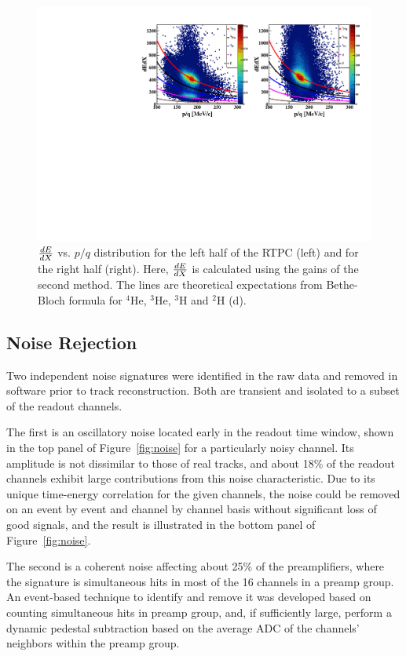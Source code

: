 \documentclass[twocolumn,showpacs,superscriptaddress,groupedaddress]{revtex4}
\begin{document}
\begin{figure}[tb]
\centering
\includegraphics[scale=0.45]{fig_2017/f_dedx_p_exp_2nd.pdf}
\caption{$\small{\frac{dE}{dX}}$ vs. $p/q$ distribution for the left half of 
   the RTPC (left) and for the right half (right). Here, 
   $\small{\frac{dE}{dX}}$ is calculated using the gains of the second method.  
   The lines are theoretical expectations from Bethe-Bloch formula for $^4$He, 
$^3$He, $^3$H and $^2$H (d).}
\label{fig:dedx_p_exp_2nd}
\end{figure}

\subsection{Noise Rejection}
Two independent noise signatures were identified in the raw data and removed in software prior to track reconstruction.  Both are transient and isolated to a subset of the readout channels. 

The first is an oscillatory noise located early in the readout time window, shown in the top panel of Figure~\ref{fig:noise} for a particularly noisy channel.  Its amplitude is not dissimilar to those of real tracks, and about 18\% of the readout channels exhibit large contributions from this noise characteristic.  Due to its unique time-energy correlation for the given channels, the noise could be removed on an event by event and channel by channel basis without significant loss of good signals, and the result is illustrated in the bottom panel of Figure~\ref{fig:noise}.

The second is a coherent noise affecting about 25\% of the preamplifiers, where 
the signature is simultaneous hits in most of the 16 channels in a preamp 
group.   An event-based technique to identify and remove it was developed based 
on counting simultaneous hits in preamp group, and, if sufficiently large, 
perform a dynamic pedestal subtraction based on the average ADC of the 
channels' neighbors within the preamp group.
\end{document}
